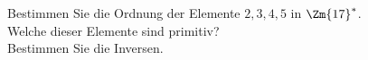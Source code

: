\begin{aufgabe}
Bestimmen Sie die Ordnung der Elemente $2, 3, 4, 5$ in $\Zm{17}^*$.\\
Welche dieser Elemente sind primitiv?\\
Bestimmen Sie die Inversen.
\end{aufgabe}
